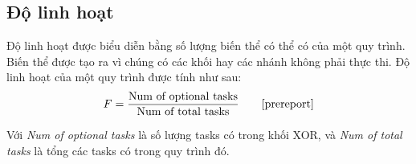 \subsection{Độ linh hoạt}
Độ linh hoạt được biểu diễn bằng số lượng biến thể có thể có của một quy trình. Biến thể được tạo ra vì chúng có các khối hay các nhánh không phải thực thi. Độ linh hoạt của một quy trình được tính như sau:
\[F = \frac{\text{Num of optional tasks}}{\text{Num of total tasks}} \tag*{\cite{prereport}}\]
\par
Với \emph{Num of optional tasks} là số lượng tasks có trong khối XOR, và \emph{Num of total tasks} là tổng các tasks có trong quy trình đó.